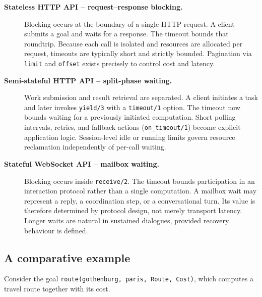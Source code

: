\begin{description}

\item[\textbf{Stateless HTTP API -- request--response blocking.}]
Blocking occurs at the boundary of a single HTTP request. A client
submits a goal and waits for a response. The timeout bounds that
roundtrip. Because each call is isolated and resources are allocated
per request, timeouts are typically short and strictly bounded.
Pagination via \texttt{limit} and \texttt{offset} exists precisely
to control cost and latency.

\item[\textbf{Semi-stateful HTTP API -- split-phase waiting.}]
Work submission and result retrieval are separated. A client
initiates a task and later invokes \texttt{yield/3} with a
\texttt{timeout/1} option. The timeout now bounds waiting for a
previously initiated computation. Short polling intervals, retries,
and fallback actions (\texttt{on\_timeout/1}) become explicit
application logic. Session-level idle or running limits govern
resource reclamation independently of per-call waiting.

\item[\textbf{Stateful WebSocket API -- mailbox waiting.}]
Blocking occurs inside \texttt{receive/2}. The timeout bounds
participation in an interaction protocol rather than a single
computation. A mailbox wait may represent a reply, a coordination
step, or a conversational turn. Its value is therefore determined by
protocol design, not merely transport latency. Longer waits are
natural in sustained dialogues, provided recovery behaviour is
defined.

\end{description}


\subsection{A comparative example}

Consider the goal
\texttt{route(gothenburg,\,paris,\,Route,\,Cost)}, which computes a
travel route together with its cost.

